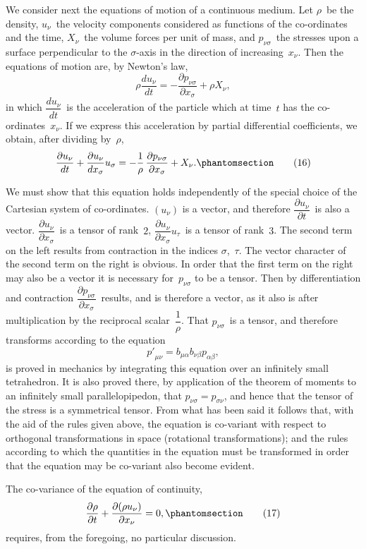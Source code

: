 \documentclass[12pt]{book}[2005/09/16]
\newcommand{\Change}[2]{#2}
\newcommand{\Add}[1]{\Change{}{#1}}
\newcommand{\PageSep}[1]{\ignorespaces}
\newcommand{\Tag}[1]{%
  \phantomsection
  \label{eqn:#1}
  \tag*{#1}
}
\newcommand{\dd}{\partial}
\begin{document}
We consider next the equations of motion of a continuous
medium. Let $\rho$~be the density, $u_{\nu}$~the velocity
components considered as functions of the co-ordinates and
the time, $X_{\nu}$~the volume forces per unit of mass, and $p_{\nu\sigma}$~the
stresses upon a surface perpendicular to the $\sigma$-axis
in the direction of increasing~$x_{\nu}$. Then the equations of
motion are, by Newton's law,
\[
\rho \frac{du_{\nu}}{dt}
  = -\frac{\dd p_{\nu\sigma}}{\dd x_{\sigma}} + \rho X_{\nu}\Add{,}
\]
in which $\dfrac{du_{\nu}}{dt}$~is the acceleration of the particle which at
\PageSep{21}
time~$t$ has the co-ordinates~$x_{\nu}$. If we express this
acceleration by partial differential coefficients, we obtain,
after dividing by~$\rho$,
\[
\frac{\dd u_{\nu}}{dt} + \frac{\dd u_{\nu}}{dx_{\sigma}} u_{\sigma}
  = -\frac{1}{\rho}\, \frac{\dd p_{\nu\sigma}}{\dd x_{\sigma}} + X_{\nu}\Add{.}
\Tag{(16)}
\]

We must show that this equation holds independently
of the special choice of the Cartesian system of co-ordinates.
$(u_{\nu})$ is a vector, and therefore $\dfrac{\dd u_{\nu}}{\dd t}$~is also a vector. $\dfrac{\dd u_{\nu}}{\dd x_{\sigma}}$~is
a tensor of rank~$2$, $\dfrac{\dd u_{\nu}}{\dd x_{\sigma}} u_{\tau}$~is a tensor of rank~$3$. The second
term on the left results from contraction in the indices
$\sigma$,~$\tau$. The vector character of the second term on the right
is obvious. In order that the first term on the right may
also be a vector it is necessary for~$p_{\nu\sigma}$ to be a tensor.
Then by differentiation and contraction $\dfrac{\dd p_{\nu\sigma}}{\dd x_{\sigma}}$~results, and
is therefore a vector, as it also is after multiplication by
the reciprocal scalar~$\dfrac{1}{\rho}$. That $p_{\nu\sigma}$~is a tensor, and therefore
transforms according to the equation
\[
{p'}_{\mu\nu} = b_{\mu\alpha} b_{\nu\beta} p_{\alpha\beta},
\]
is proved in mechanics by integrating this equation over
an infinitely small tetrahedron. It is also proved there,
by application of the theorem of moments to an infinitely
small parallelopipedon, that $p_{\nu\sigma} = p_{\sigma\nu}$, and hence that the
tensor of the stress is a symmetrical tensor. From what
has been said it follows that, with the aid of the rules
\PageSep{22}
given above, the equation is co-variant with respect to
orthogonal transformations in space (rotational transformations);
and the rules according to which the
quantities in the equation must be transformed in order
that the equation may be co-variant also become evident.

The co-variance of the equation of continuity,
%
%
\[
\frac{\dd\rho}{\dd t} + \frac{\dd(\rho u_{\nu})}{\dd x_{\nu}} = 0\Add{,}
\Tag{(17)}
\]
requires, from the foregoing, no particular discussion.
\end{document}
